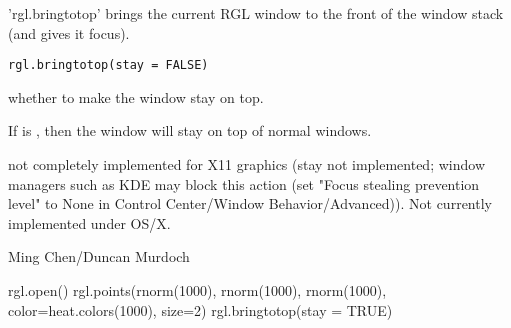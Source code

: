 \documentclass{article}
\begin{document}
\begin{Description}\relax
'rgl.bringtotop' brings the current RGL window to the
front of the window stack (and gives it focus).
\end{Description}
\begin{Usage}
\begin{verbatim}
rgl.bringtotop(stay = FALSE)
\end{verbatim}
\end{Usage}
\begin{Arguments}
\begin{ldescription}
\item[\code{stay}] whether to make the window stay on top.
\end{ldescription}
\end{Arguments}
\begin{Details}\relax
If  is , then the window will stay on top
of normal windows.
\end{Details}
\begin{Note}\relax
not completely implemented for X11 graphics (stay not implemented;
window managers such as KDE may block this action
(set "Focus stealing prevention level" to None in Control Center/Window Behavior/Advanced)).
Not currently implemented under OS/X.
\end{Note}
\begin{Author}\relax
Ming Chen/Duncan Murdoch
\end{Author}
\begin{SeeAlso}\relax
{}
\end{SeeAlso}
\begin{Examples}
\begin{ExampleCode}
rgl.open()
rgl.points(rnorm(1000), rnorm(1000), rnorm(1000), color=heat.colors(1000), size=2)
rgl.bringtotop(stay = TRUE)    
\end{ExampleCode}
\end{Examples}
\end{document}

